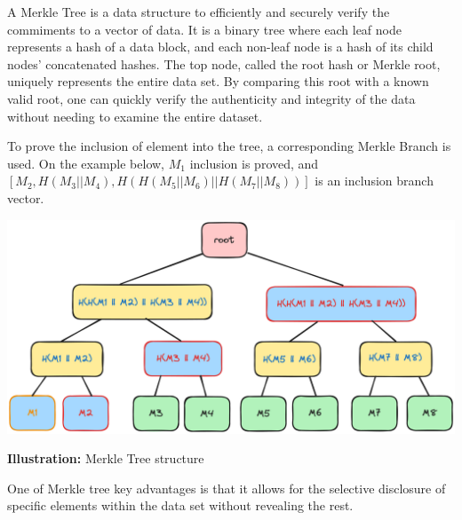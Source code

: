 \documentclass[../lecture-notes.tex]{subfiles}
\begin{document}
A Merkle Tree is a data structure to efficiently and securely verify the commiments to a vector of data. It is a binary tree where each leaf node represents a hash of a data block, and each non-leaf node is a hash of its child nodes' concatenated hashes. The top node, called the root hash or Merkle root, uniquely represents the entire data set. By comparing this root with a known valid root, one can quickly verify the authenticity and integrity of the data without needing to examine the entire dataset. 

To prove the inclusion of element into the tree, a corresponding Merkle Branch is used. On the example below, $M_1$ inclusion is proved, and 
$[M_2, H(M_3 || M_4), H(H(M_5 || M_6) || H(M_7 || M_8))]$ is an inclusion branch vector.

\begin{center}
    \centering\includegraphics[width=0.9\linewidth, clip]{images/lecture_5/MerkleTreeProof.png}

    \scriptsize{\textbf{Illustration:} Merkle Tree structure}
\end{center}

One of Merkle tree key advantages is that it allows for the selective disclosure of specific elements within the data set without revealing the rest. 
\end{document}

